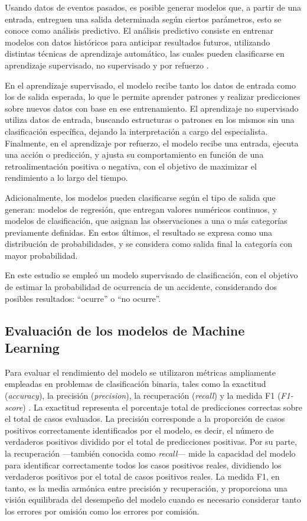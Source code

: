 \documentclass[12pt]{article}
\begin{document}
Usando datos de eventos pasados, es posible generar modelos que, a partir de una entrada, entreguen una salida determinada según ciertos parámetros, esto se conoce como análisis predictivo. El análisis predictivo consiste en entrenar modelos con datos históricos para anticipar resultados futuros, utilizando distintas técnicas de aprendizaje automático, las cuales pueden clasificarse en aprendizaje supervisado, no supervisado y por refuerzo \parencite{murphy2012machine, geron2019hands, bishop2006pattern}.

En el aprendizaje supervisado, el modelo recibe tanto los datos de entrada como los de salida esperada, lo que le permite aprender patrones y realizar predicciones sobre nuevos datos con base en ese entrenamiento. El aprendizaje no supervisado utiliza datos de entrada, buscando estructuras o patrones en los mismos sin una clasificación específica, dejando la interpretación a cargo del especialista. Finalmente, en el aprendizaje por refuerzo, el modelo recibe una entrada, ejecuta una acción o predicción, y ajusta su comportamiento en función de una retroalimentación positiva o negativa, con el objetivo de maximizar el rendimiento a lo largo del tiempo.

Adicionalmente, los modelos pueden clasificarse según el tipo de salida que generan: modelos de regresión, que entregan valores numéricos continuos, y modelos de clasificación, que asignan las observaciones a una o más categorías previamente definidas. En estos últimos, el resultado se expresa como una distribución de probabilidades, y se considera como salida final la categoría con mayor probabilidad.

En este estudio se empleó un modelo supervisado de clasificación, con el objetivo de estimar la probabilidad de ocurrencia de un accidente, considerando dos posibles resultados: “ocurre” o “no ocurre”.

\subsection{Evaluación de los modelos de Machine Learning}

Para evaluar el rendimiento del modelo se utilizaron métricas ampliamente empleadas en problemas de clasificación binaria, tales como la exactitud (\textit{accuracy}), la precisión (\textit{precision}), la recuperación (\textit{recall}) y la medida F1 (\textit{F1-score}) \parencite{manning2008}. La exactitud representa el porcentaje total de predicciones correctas sobre el total de casos evaluados. La precisión corresponde a la proporción de casos positivos correctamente identificados por el modelo, es decir, el número de verdaderos positivos dividido por el total de predicciones positivas. Por su parte, la recuperación —también conocida como \textit{recall}— mide la capacidad del modelo para identificar correctamente todos los casos positivos reales, dividiendo los verdaderos positivos por el total de casos positivos reales. La medida F1, en tanto, es la media armónica entre precisión y recuperación, y proporciona una visión equilibrada del desempeño del modelo cuando es necesario considerar tanto los errores por omisión como los errores por comisión.
\end{document}
